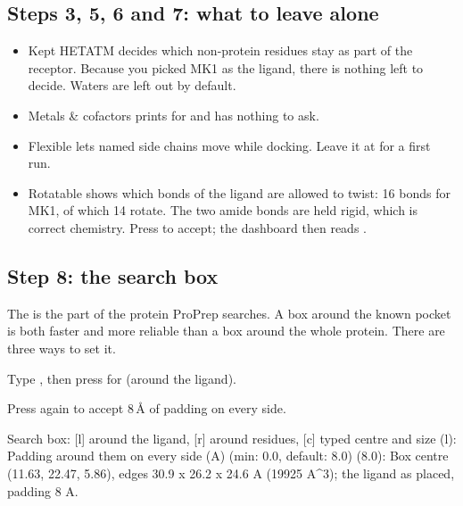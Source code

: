 \subsection{Steps 3, 5, 6 and 7: what to leave alone}

\begin{itemize}
  \item {} \textsf{Kept HETATM} decides which non-protein residues stay
        as part of the receptor. Because you picked MK1 as the ligand, there
        is nothing left to decide. Waters are left out by default.
  \item {} \textsf{Metals \& cofactors} prints  for  and has nothing to ask.
  \item {} \textsf{Flexible} lets named side chains move while docking.
        Leave it at  for a first run.
  \item {} \textsf{Rotatable} shows which bonds of the ligand are allowed
        to twist: 16 bonds for MK1, of which 14 rotate. The two amide bonds
        are held rigid, which is correct chemistry. Press  to
        accept; the dashboard then reads .
\end{itemize}

\subsection{Step 8: the search box}

The  is the part of the protein ProPrep searches. A box
around the known pocket is both faster and more reliable than a box around the
whole protein. There are three ways to set it.

\begin{steps}
  \item Type , then press  for  (around the ligand).
  \item Press  again to accept 8\,\AA{} of padding on every side.
\begin{screen}
Search box: [l] around the ligand, [r] around residues, [c] typed centre
and size (l):
Padding around them on every side (A) (min: 0.0, default: 8.0) (8.0):
  Box centre (11.63, 22.47, 5.86), edges 30.9 x 26.2 x 24.6 A (19925 A^3);
  the ligand as placed, padding 8 A.
\end{screen}
\end{steps}

